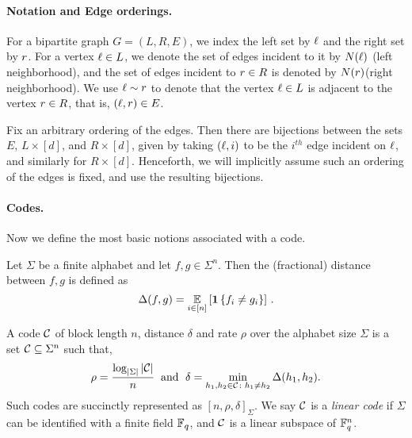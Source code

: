 \paragraph{Notation and Edge orderings.} 
For a bipartite graph $G=(L,R,E)$, we index the left set by ${ \ell }$ and the right set by ${ r }$. For a vertex ${ \ell } \in L$, 
we denote the set of edges incident to it by $N({ \ell })$ (left neighborhood), and the set of edges
incident to  ${ r }\in R$ is denoted by $N({ r })$(right neighborhood). 
%
We use ${ \ell } \sim { r }$ to denote that the vertex ${ \ell } \in L$ is adjacent to the vertex ${ r } \in R$, that is, $({ \ell },{ r })\in E$. 

Fix an arbitrary ordering of the edges. Then there are bijections between the sets $E$, $L \times
[d]$, and $R \times [d]$, 
given by taking $({ \ell },i)$ to be the $i^{th}$ edge incident on ${ \ell }$, and similarly for $R \times [d]$.
Henceforth, we will implicitly assume such an ordering of the edges is fixed, and use the resulting bijections.


\paragraph{Codes.} Now we define the most basic notions associated with a code. 
\begin{definition}
	Let $\Sigma$ be a finite alphabet and let $f,g\in \Sigma^n$. Then the (fractional) distance
        between $f,g$ is defined as \[ \dis(f,g) = \Ex{i\in [n]}{ \indi{f_i \neq g_i}} \mper \]
\end{definition}

\begin{definition}
	A code ${\mathcal C}$ of block length $n$, distance $\delta$ and rate $\rho$ over the alphabet size $\Sigma$ is a set ${\mathcal C} \subseteq \Sigma^n$ such that,
	\[
	\rho = \frac{\log_{|\Sigma|} |{\mathcal C}|}{n} \;\;\text{and }\; \delta = \min_{h_1,h_2\in {\mathcal C} \colon h_1 \ne h_2} {\Delta}(h_1,h_2).
	\]	
	Such codes are succinctly represented as $[n,\rho,\delta]_\Sigma$.
	We say ${\mathcal C}$ is a \emph{linear code} if $\Sigma$ can be identified with a finite field ${\mathbb F}_q$, and ${\mathcal C}$ is a linear subspace of ${\mathbb F}_q^n$.
\end{definition}

